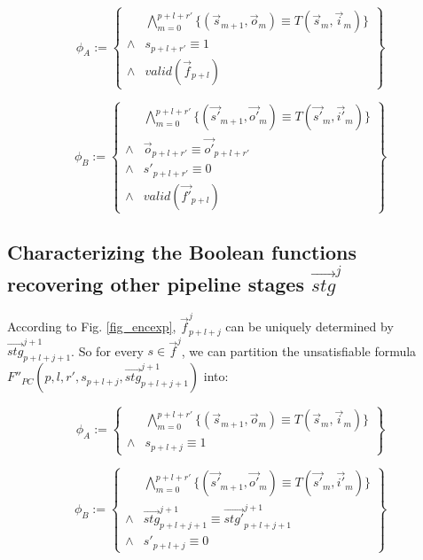 \documentclass[conference]{IEEEtran}
\begin{document}
\begin{equation}\label{eqn_char_dlast_A}
 \phi_A := 
 \left\{
\begin{array}{cc}
&\bigwedge_{m=0}^{p+l+r'}
\{
(\vec{s}_{m+1},\vec{o}_m)\equiv T(\vec{s}_m,\vec{i}_m)
\}
\\
\wedge& s_{p+l+r'}\equiv 1 \\
\wedge& valid(\vec{f}_{p+l})
\end{array}
\right\}
\end{equation}

\begin{equation}\label{eqn_char_dlast_B}
\phi_B := 
\left\{
\begin{array}{cc}
&\bigwedge_{m=0}^{p+l+r'}
\{
(\vec{s'}_{m+1},\vec{o'}_m)\equiv T(\vec{s'}_m,\vec{i'}_m)
\}
\\
\wedge&\vec{o}_{p+l+r'}\equiv \vec{o'}_{p+l+r'} \\
\wedge& s'_{p+l+r'}\equiv 0 \\
\wedge& valid(\vec{f'}_{p+l})
\end{array}
\right\}
\end{equation}


\subsection{Characterizing the Boolean functions recovering other pipeline stages $\vec{stg}^j$}
According to Fig. \ref{fig_encexp},
$\vec{f}^j_{p+l+j}$ can be uniquely determined by $\vec{stg}^{j+1}_{p+l+j+1}$.
So for every $s\in\vec{f}^j$,
we can partition the unsatisfiable formula $F''_{PC}(p,l,r',s_{p+l+j},\vec{stg}^{j+1}_{p+l+j+1})$ 
 into:

\begin{equation}
 \phi_A := 
 \left\{
\begin{array}{cc}
&\bigwedge_{m=0}^{p+l+r'}
\{
(\vec{s}_{m+1},\vec{o}_m)\equiv T(\vec{s}_m,\vec{i}_m)
\}
\\
\wedge& s_{p+l+j}\equiv 1 
\end{array}
\right\}
\end{equation}

\begin{equation}
\phi_B := 
\left\{
\begin{array}{cc}
&\bigwedge_{m=0}^{p+l+r'}
\{
(\vec{s'}_{m+1},\vec{o'}_m)\equiv T(\vec{s'}_m,\vec{i'}_m)
\}
\\
\wedge&\vec{stg}^{j+1}_{p+l+j+1}\equiv \vec{stg'}^{j+1}_{p+l+j+1} \\
\wedge& s'_{p+l+j}\equiv 0 
\end{array}
\right\}
\end{equation}
\end{document}

